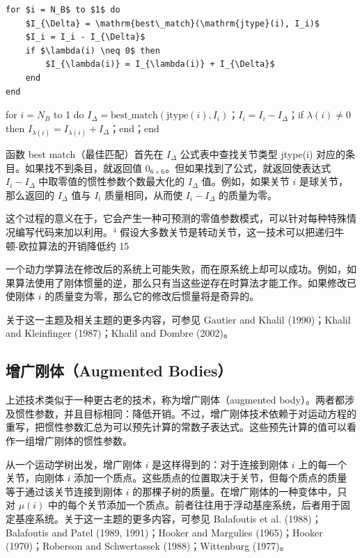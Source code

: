 \documentclass[10pt,a4paper]{book}
\theoremstyle{thmstyle} %
\theoremstyle{defstyle} %
\theoremstyle{prostyle} %
\begin{document}
\begin{verbatim}
for $i = N_B$ to $1$ do
    $I_{\Delta} = \mathrm{best\_match}(\mathrm{jtype}(i), I_i)$
    $I_i = I_i - I_{\Delta}$
    if $\lambda(i) \neq 0$ then
        $I_{\lambda(i)} = I_{\lambda(i)} + I_{\Delta}$
    end
end
\end{verbatim}
for $i=N_{B}$ to 1 do $I_{\Delta}=\text{best\_match}(\mathrm{jtype}(i),I_{i})$；$I_{i}=I_{i}-I_{\Delta}$；if $\lambda(i)\neq 0$ then $I_{\lambda(i)}=I_{\lambda(i)}+I_{\Delta}$；end；end



函数 best match（最佳匹配）首先在 $I_{\Delta}$ 公式表中查找关节类型 jtype(i) 对应的条目。如果找不到条目，就返回值 $0_{6\times6}$。但如果找到了公式，就返回使表达式 $I_{i}-I_{\Delta}$ 中取零值的惯性参数个数最大化的 $I_{\Delta}$ 值。例如，如果关节 $i$ 是球关节，那么返回的 $I_{\Delta}$ 值与 $I_{i}$ 质量相同，从而使 $I_{i}-I_{\Delta}$ 的质量为零。



这个过程的意义在于，它会产生一种可预测的零值参数模式，可以针对每种特殊情况编写代码来加以利用。$^{4}$ 假设大多数关节是转动关节，这一技术可以把递归牛顿-欧拉算法的开销降低约 15%



一个动力学算法在修改后的系统上可能失败，而在原系统上却可以成功。例如，如果算法使用了刚体惯量的逆，那么只有当这些逆存在时算法才能工作。如果修改已使刚体 $i$ 的质量变为零，那么它的修改后惯量将是奇异的。



关于这一主题及相关主题的更多内容，可参见 Gautier and Khalil (1990)；Khalil and Kleinfinger (1987)；Khalil and Dombre (2002)。



\subsection{增广刚体（Augmented Bodies）}





上述技术类似于一种更古老的技术，称为增广刚体（augmented body）。两者都涉及惯性参数，并且目标相同：降低开销。不过，增广刚体技术依赖于对运动方程的重写，把惯性参数汇总为可以预先计算的常数子表达式。这些预先计算的值可以看作一组增广刚体的惯性参数。



从一个运动学树出发，增广刚体 $i$ 是这样得到的：对于连接到刚体 $i$ 上的每一个关节，向刚体 $i$ 添加一个质点。这些质点的位置取决于关节，但每个质点的质量等于通过该关节连接到刚体 $i$ 的那棵子树的质量。在增广刚体的一种变体中，只对 $\mu(i)$ 中的每个关节添加一个质点。前者往往用于浮动基座系统，后者用于固定基座系统。关于这一主题的更多内容，可参见 Balafoutis et al. (1988)；Balafoutis and Patel (1989, 1991)；Hooker and Margulies (1965)；Hooker (1970)；Roberson and Schwertassek (1988)；Wittenburg (1977)。
\end{document}

